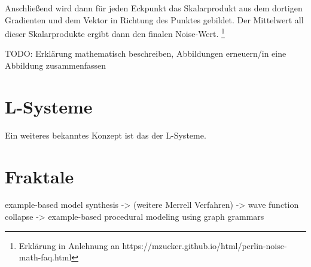 Anschließend wird dann für jeden Eckpunkt
das Skalarprodukt aus dem dortigen Gradienten und dem Vektor in Richtung des Punktes gebildet. Der Mittelwert all dieser Skalarprodukte ergibt
dann den finalen Noise-Wert. \cite{16_perlin}\footnote{Erklärung in Anlehnung an https://mzucker.github.io/html/perlin-noise-math-faq.html}

TODO: Erklärung mathematisch beschreiben, Abbildungen erneuern/in eine Abbildung zusammenfassen

\section{L-Systeme}
Ein weiteres bekanntes Konzept ist das der L-Systeme.

\section{Fraktale}




example-based model synthesis -> (weitere Merrell Verfahren) -> wave function collapse -> example-based procedural modeling using graph grammars
